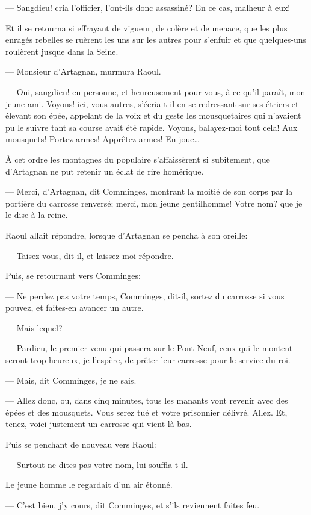 — Sangdieu! cria l'officier, l'ont-ils donc assassiné? En ce cas, malheur à eux!

Et il se retourna si effrayant de vigueur, de colère et de menace, que les plus enragés rebelles se ruèrent les uns sur les autres pour s'enfuir et que quelques-uns roulèrent jusque dans la Seine.

— Monsieur d'Artagnan, murmura Raoul.

— Oui, sangdieu! en personne, et heureusement pour vous, à ce qu'il paraît, mon jeune ami. Voyons! ici, vous autres, s'écria-t-il en se redressant sur ses étriers et élevant son épée, appelant de la voix et du geste les mousquetaires qui n'avaient pu le suivre tant sa course avait été rapide. Voyons, balayez-moi tout cela! Aux mousquets! Portez armes! Apprêtez armes! En joue\dots

À cet ordre les montagnes du populaire s'affaissèrent si subitement, que d'Artagnan ne put retenir un éclat de rire homérique.

— Merci, d'Artagnan, dit Comminges, montrant la moitié de son corps par la portière du carrosse renversé; merci, mon jeune gentilhomme! Votre nom? que je le dise à la reine.

Raoul allait répondre, lorsque d'Artagnan se pencha à son oreille:

— Taisez-vous, dit-il, et laissez-moi répondre.

Puis, se retournant vers Comminges:

— Ne perdez pas votre temps, Comminges, dit-il, sortez du carrosse si vous pouvez, et faites-en avancer un autre.

— Mais lequel?

— Pardieu, le premier venu qui passera sur le Pont-Neuf, ceux qui le montent seront trop heureux, je l'espère, de prêter leur carrosse pour le service du roi.

— Mais, dit Comminges, je ne sais.

— Allez donc, ou, dans cinq minutes, tous les manants vont revenir avec des épées et des mousquets. Vous serez tué et votre prisonnier délivré. Allez. Et, tenez, voici justement un carrosse qui vient là-bas.

Puis se penchant de nouveau vers Raoul:

— Surtout ne dites pas votre nom, lui souffla-t-il.

Le jeune homme le regardait d'un air étonné.

— C'est bien, j'y cours, dit Comminges, et s'ils reviennent faites feu.

